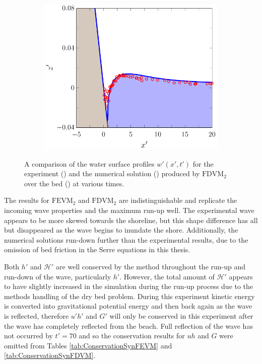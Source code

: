 \begin{figure}
\begin{subfigure}{0.5\textwidth}
		\vspace{0.5cm}
	\end{subfigure}
	\begin{subfigure}{0.5\textwidth}
		\includegraphics[width=\textwidth]{./chp6/figures/Experiment/Synolakis/H0p0185/FDVM/70s.pdf}
		\vspace{0.5cm}
	\end{subfigure}
	\caption{A comparison of the water surface profiles $w'(x',t')$ for the experiment () and the numerical solution () produced by $\text{FDVM}_2$ over the bed () at various times.}
	\label{fig:SynolakisFDVMNoBreak}
\end{figure}

The results for $\text{FEVM}_2$ and $\text{FDVM}_2$ are indistinguishable and replicate the incoming wave properties and the maximum run-up well. The experimental wave appears to be more skewed towards the shoreline, but this shape difference has all but disappeared as the wave begins to inundate the shore. Additionally, the numerical solutions run-down further than the experimental results, due to the omission of bed friction in the Serre equations in this thesis.

Both $h'$ and $\mathcal{H}'$ are well conserved by the method throughout the run-up and run-down of the wave, particularly $h'$. However, the total amount of $\mathcal{H}'$ appears to have slightly increased in the simulation during the run-up process due to the methods handling of the dry bed problem. During this experiment kinetic energy is converted into gravitational potential energy and then back again as the wave is reflected, therefore $u'h'$ and $G'$ will only be conserved in this experiment after the wave has completely reflected from the beach. Full reflection of the wave has not occurred by $t'=70$ and so the conservation results for $uh$ and $G$ were omitted from Tables \ref{tab:ConservationSynFEVM} and \ref{tab:ConservationSynFDVM}.

